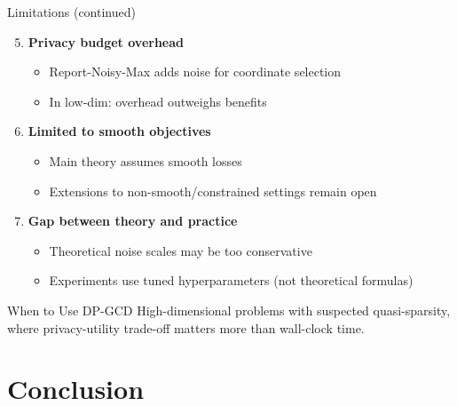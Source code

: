 \documentclass{beamer}
\begin{document}
\begin{frame}{Limitations (continued)}
\begin{enumerate}
\setcounter{enumi}{4}
\item \textbf{Privacy budget overhead}
\begin{itemize}
\item Report-Noisy-Max adds noise for coordinate selection
\item In low-dim: overhead outweighs benefits
\end{itemize}

\item \textbf{Limited to smooth objectives}
\begin{itemize}
\item Main theory assumes smooth losses
\item Extensions to non-smooth/constrained settings remain open
\end{itemize}

\item \textbf{Gap between theory and practice}
\begin{itemize}
\item Theoretical noise scales may be too conservative
\item Experiments use tuned hyperparameters (not theoretical formulas)
\end{itemize}
\end{enumerate}

\vspace{1em}

\begin{block}{When to Use DP-GCD}
High-dimensional problems with suspected quasi-sparsity, where privacy-utility trade-off matters more than wall-clock time.
\end{block}
\end{frame}

\section{Conclusion}
\end{document}
